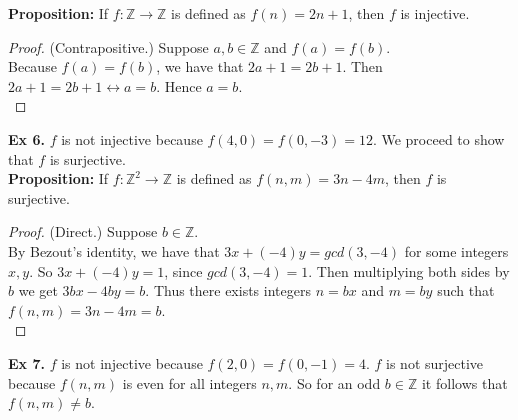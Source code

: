 \documentclass{article}
\begin{document}
\noindent\textbf{Proposition:} If $f: \mathbb{Z} \rightarrow \mathbb{Z}$ is defined as $f(n)=2n+1$, then $f$ is injective.
\begin{proof}
(Contrapositive.) Suppose $a, b \in \mathbb{Z}$ and $f(a)=f(b)$.\\
Because $f(a)=f(b)$, we have that $2a+1=2b+1$. Then $2a+1=2b+1 \leftrightarrow a = b$. Hence $a=b$.\\
\end{proof}

\noindent\textbf{Ex 6.} $f$ is not injective because $f(4, 0) = f(0, -3) = 12$. We proceed to show that $f$ is surjective.\\

\noindent\textbf{Proposition:} If $f: \mathbb{Z}^2 \rightarrow \mathbb{Z}$ is defined as $f(n,m)=3n-4m$, then $f$ is surjective.
\begin{proof}
(Direct.) Suppose $b \in \mathbb{Z}$.\\
By Bezout's identity, we have that $3x+(-4)y=gcd(3, -4)$ for some integers $x, y$. So $3x+(-4)y=1$, since $gcd(3,-4)=1$. Then multiplying both sides by $b$ we get $3bx-4by=b$. Thus there exists integers $n=bx$ and $m=by$ such that $f(n,m)=3n-4m=b$.\\
\end{proof}

\noindent\textbf{Ex 7.} $f$ is not injective because $f(2, 0)=f(0, -1)=4$. $f$ is not surjective because  $f(n, m)$ is even for all integers $n, m$. So for an odd $b \in \mathbb{Z}$ it follows that $f(n,m) \neq b$.\\
\end{document}

